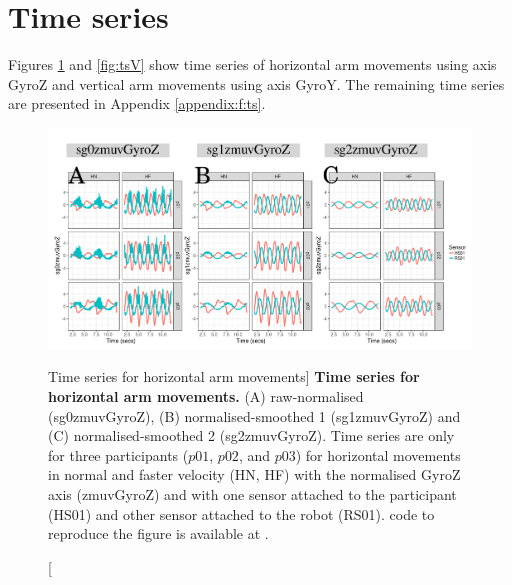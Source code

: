 \section{Time series}
Figures \ref{fig:tsH} and \ref{fig:tsV}
show time series of horizontal arm movements using axis GyroZ 
and  vertical arm movements using axis GyroY. 
The remaining time series are presented in Appendix \ref{appendix:f:ts}.
\begin{figure}
  \centering
\includegraphics[width=1.0\textwidth]{fig_6_01}
    	\caption
	[Time series for horizontal arm movements]{
	{\bf Time series for horizontal arm movements.}
		(A) raw-normalised (sg0zmuvGyroZ), 
		(B) normalised-smoothed 1 (sg1zmuvGyroZ) and
		(C) normalised-smoothed 2 (sg2zmuvGyroZ).
		Time series are only for three participants 
		($p01$, $p02$, and $p03$) 
		for horizontal movements in normal and faster velocity (HN, HF) 
		with the normalised GyroZ axis (zmuvGyroZ) 
		and with one sensor attached to the participant (HS01) 
		and other sensor attached to the robot (RS01).	
	\R code to reproduce the figure is available at 
	.
        }
    \label{fig:tsH}
\end{figure}
